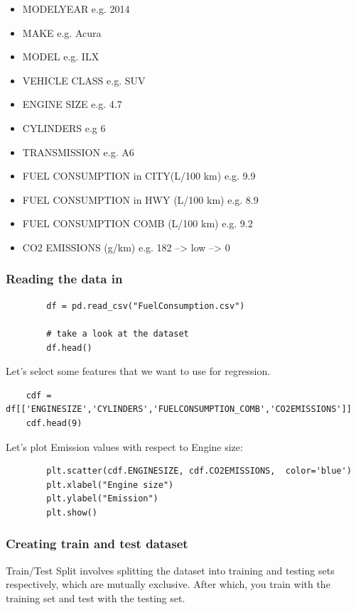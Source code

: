 	\begin{itemize}
		\item   MODELYEAR e.g. 2014
		\item   MAKE e.g. Acura
		\item   MODEL e.g. ILX
		\item   VEHICLE CLASS e.g. SUV
		\item   ENGINE SIZE e.g. 4.7
		\item   CYLINDERS e.g 6
		\item   TRANSMISSION e.g. A6
		\item   FUEL CONSUMPTION in CITY(L/100 km) e.g. 9.9
		\item   FUEL CONSUMPTION in HWY (L/100 km) e.g. 8.9
		\item   FUEL CONSUMPTION COMB (L/100 km) e.g. 9.2
		\item   CO2 EMISSIONS (g/km) e.g. 182   --> low --> 0
	\end{itemize}
	
	\subsubsection{Reading the data in}
	
	\begin{verbatim}
		df = pd.read_csv("FuelConsumption.csv")
		
		# take a look at the dataset
		df.head()
	\end{verbatim}
	
	Let's select some features that we want to use for regression.
	
	\begin{verbatim}
	cdf = df[['ENGINESIZE','CYLINDERS','FUELCONSUMPTION_COMB','CO2EMISSIONS']]
	cdf.head(9)
	\end{verbatim}
	
	Let's plot Emission values with respect to Engine size:
	
	\begin{verbatim}
		plt.scatter(cdf.ENGINESIZE, cdf.CO2EMISSIONS,  color='blue')
		plt.xlabel("Engine size")
		plt.ylabel("Emission")
		plt.show()
	\end{verbatim}
	
	\subsubsection{Creating train and test dataset}
	
	Train/Test Split involves splitting the dataset into training and testing sets respectively, which are mutually exclusive. After which, you train with the training set and test with the testing set.
	
